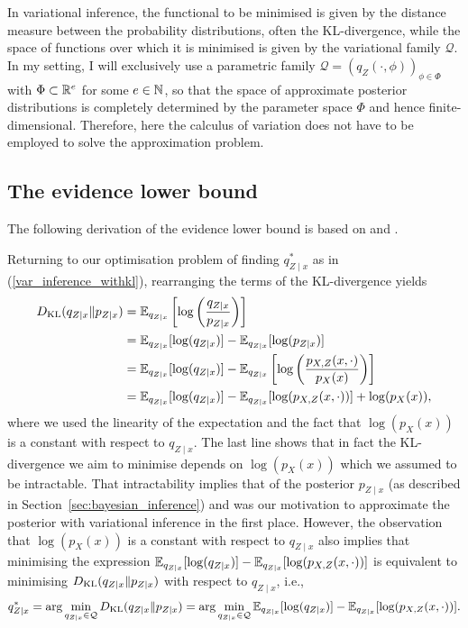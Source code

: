 In variational inference, the functional to be minimised is given by the distance measure between the probability distributions, often the KL-divergence, while the space of functions over which it is minimised is given by the variational family $\mathcal{Q}$. In my setting, I will exclusively use a parametric family $\mathcal{Q} = (q_{Z}(\cdot,\phi))_{\phi\in\Phi}$ with $\Phi \subset \mathbb{R}^e$ for some $e\in \mathbb{N}$, so that the space of approximate posterior distributions is completely determined by the parameter space $\Phi$ and hence finite-dimensional. Therefore, here the calculus of variation does not have to be employed to solve the approximation problem.

\subsection{The evidence lower bound}\label{sec:ELBO}

The following derivation of the evidence lower bound is based on \cite[pp.~6f.]{Blei} and \cite[pp.~16-18]{Kingma2019}. 

Returning to our optimisation problem of finding $q_{Z\mid x}^*$ as in (\ref{var_inference_withkl}), rearranging the terms of the KL-divergence yields
	\begin{equation}\label{kl-decomposition}
\begin{split}
D_{\mathrm{KL}}(q_{Z\mid x}\Vert p_{Z\mid x})  &= \mathbb{E}_{q_{Z\mid x}}\left[\log\left(\frac{q_{Z\mid x}}{p_{Z\mid x}}\right)\right] \\
&= \mathbb{E}_{q_{Z\mid x}}[\log(q_{Z\mid x})] - \mathbb{E}_{q_{Z\mid x}}[\log(p_{Z\mid x})] \\
&= \mathbb{E}_{q_{Z\mid x}}[\log(q_{Z\mid x})] - \mathbb{E}_{q_{Z\mid x}}\left[\log\left(\frac{p_{X,Z}(x,\cdot)}{p_{X}(x)}\right)\right] \\
&= \mathbb{E}_{q_{Z\mid x}}[\log(q_{Z\mid x})] - \mathbb{E}_{q_{Z\mid x}}[\log(p_{X,Z}(x,\cdot))] + \log(p_{X}(x)),
\end{split}
\end{equation}
where we used the linearity of the expectation and the fact that $\log(p_{X}(x))$ is a constant with respect to $q_{Z\mid x}$. The last line shows that in fact the KL-divergence we aim to minimise depends on $\log(p_{X}(x))$ which we assumed to be intractable. That intractability implies that of the posterior $p_{Z\mid x}$ (as described in Section~\ref{sec:bayesian_inference}) and was our motivation to approximate the posterior with variational inference in the first place. However, the observation that $\log(p_{X}(x))$ is a constant with respect to $q_{Z\mid x}$ also implies that minimising the expression
$\mathbb{E}_{q_{Z\mid x}}[\log(q_{Z\mid x})] - \mathbb{E}_{q_{Z\mid x}}[\log(p_{X,Z}(x,\cdot))]$
is equivalent to minimising $D_{\mathrm{KL}}(q_{Z\mid x}\Vert p_{Z\mid x})$ with respect to $q_{Z\mid x}$, i.e.,
$$
q_{Z\mid x}^* = \arg \min_{q_{Z\mid x}\in\mathcal{Q}} D_{\mathrm{KL}}(q_{Z\mid x}\Vert p_{Z\mid x}) = \arg \min_{q_{Z\mid x}\in\mathcal{Q}} \mathbb{E}_{q_{Z\mid x}}[\log(q_{Z\mid x})] - \mathbb{E}_{q_{Z\mid x}}[\log(p_{X,Z}(x,\cdot))].
$$

